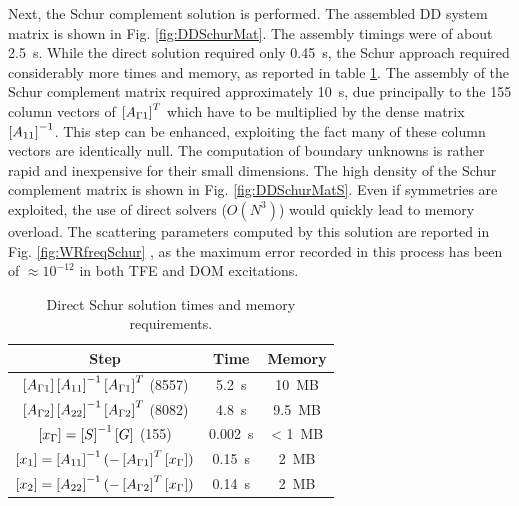 Next, the Schur complement solution is performed. The assembled DD system matrix is shown in Fig. \ref{fig:DDSchurMat}. The assembly timings were of about 2.5~s. While the direct solution required only 0.45~s, the Schur approach required considerably more times and memory, as reported in table \ref{tab:SchurSol}. The assembly of the Schur complement matrix required approximately 10~s, due principally to the 155 column vectors of $\left[A_{\Gamma 1}\right]^T$ which have to be multiplied by the dense matrix $\left[A_{11}\right]^{-1}$. This step can be enhanced, exploiting the fact many of these column vectors are identically null. The computation of boundary unknowns is rather rapid and inexpensive for their small dimensions. The high density of the Schur complement matrix is shown in Fig. \ref{fig:DDSchurMatS}. Even if symmetries are exploited, the use of direct solvers ($O(N^3)$) would quickly lead to memory overload. The scattering parameters computed by this solution are reported in Fig. \ref{fig:WRfreqSchur} , as the maximum error recorded in this process has been of $\approx 10^{-12}$ in both TFE and DOM excitations.

\begin{table}[ht!]
\begin{center}
\begin{tabular}{|c|c|c|}
\hline 
Step & Time & Memory \\ 
\hline
\hline 
$\left[A_{\Gamma 1}\right] \left[A_{11}\right]^{-1} \left[A_{\Gamma 1}\right]^T$ (8557) & 5.2~s & 10~MB\\ \hline 
$\left[A_{\Gamma 2}\right] \left[A_{22}\right]^{-1} \left[A_{\Gamma 2}\right]^T$ (8082) & 4.8~s & 9.5~MB\\ \hline 
$\left[x_\Gamma\right] = \left[S\right]^{-1} \left[G\right]$ (155) & 0.002~s & < 1~MB\\ \hline 
$\left[x_1\right] = \left[A_{11}\right]^{-1} (-\left[A_{\Gamma 1}\right]^T \left[x_\Gamma\right])$ & 0.15~s &  2~MB\\ \hline 
$\left[x_2\right] = \left[A_{22}\right]^{-1} (-\left[A_{\Gamma 2}\right]^T \left[x_\Gamma\right])$ & 0.14~s &  2~MB\\ \hline 
\end{tabular}
\end{center}
\caption{Direct Schur solution times and memory requirements.}
\label{tab:SchurSol}
\end{table}

